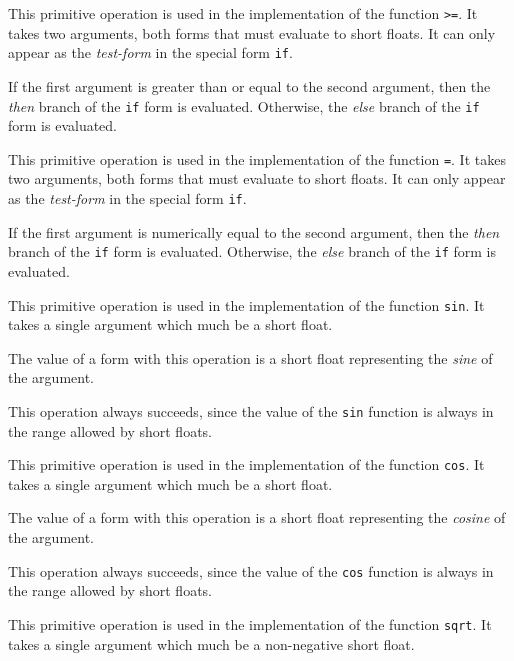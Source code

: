 
This primitive operation is used in the implementation of the
\commonlisp{} function \texttt{>=}.  It takes two arguments, both forms
that must evaluate to short floats.  It can only appear as the
\emph{test-form} in the special form \texttt{if}.

If the first argument is greater than or equal to the second argument,
then the \emph{then} branch of the \texttt{if} form is evaluated.
Otherwise, the \emph{else} branch of the \texttt{if} form is
evaluated.


This primitive operation is used in the implementation of the
\commonlisp{} function \texttt{=}.  It takes two arguments, both forms
that must evaluate to short floats.  It can only appear as the
\emph{test-form} in the special form \texttt{if}.

If the first argument is numerically equal to the second argument,
then the \emph{then} branch of the \texttt{if} form is evaluated.
Otherwise, the \emph{else} branch of the \texttt{if} form is
evaluated.


This primitive operation is used in the implementation of the
\commonlisp{} function \texttt{sin}.  It takes a single argument which
much be a short float.

The value of a form with this operation is a short float representing
the \emph{sine} of the argument.

This operation always succeeds, since the value of the \texttt{sin}
function is always in the range allowed by short floats.


This primitive operation is used in the implementation of the
\commonlisp{} function \texttt{cos}.  It takes a single argument which
much be a short float.

The value of a form with this operation is a short float representing
the \emph{cosine} of the argument.

This operation always succeeds, since the value of the \texttt{cos}
function is always in the range allowed by short floats.


This primitive operation is used in the implementation of the
\commonlisp{} function \texttt{sqrt}.  It takes a single argument which
much be a non-negative short float.

